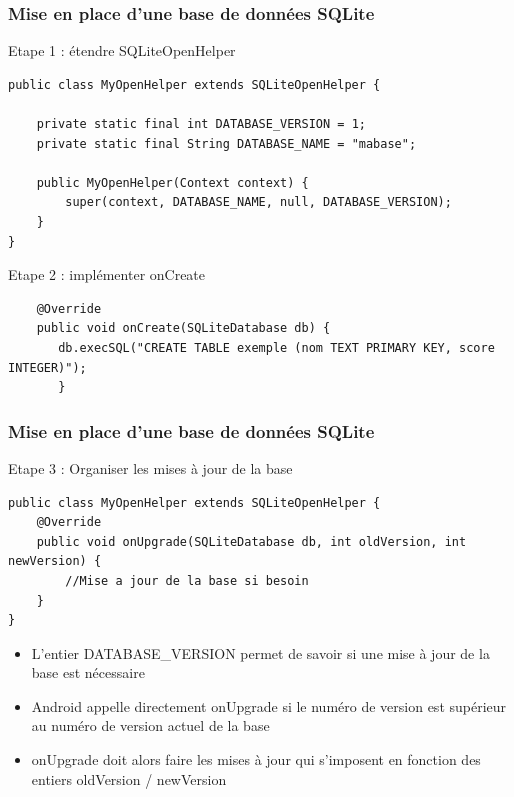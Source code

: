 \documentclass{beamer}
\begin{document}
\begin{frame}[fragile]
\frametitle{Mise en place d'une base de données SQLite}
Etape 1 : étendre SQLiteOpenHelper 
\begin{lstlisting}
public class MyOpenHelper extends SQLiteOpenHelper {

    private static final int DATABASE_VERSION = 1;
    private static final String DATABASE_NAME = "mabase";

    public MyOpenHelper(Context context) {
        super(context, DATABASE_NAME, null, DATABASE_VERSION);
    }
}
\end{lstlisting}
Etape 2 : implémenter onCreate
\begin{lstlisting}
    @Override
    public void onCreate(SQLiteDatabase db) {
       db.execSQL("CREATE TABLE exemple (nom TEXT PRIMARY KEY, score INTEGER)");
       }
\end{lstlisting}
\end{frame}
\begin{frame}[fragile]
\frametitle{Mise en place d'une base de données SQLite}
Etape 3 : Organiser les mises à jour de la base
\begin{lstlisting}
public class MyOpenHelper extends SQLiteOpenHelper {
    @Override
    public void onUpgrade(SQLiteDatabase db, int oldVersion, int newVersion) {
        //Mise a jour de la base si besoin
    }
}
\end{lstlisting}
\begin{itemize}
    \item L'entier DATABASE\_VERSION permet de savoir si une mise à jour de la base est nécessaire
    \item Android appelle directement onUpgrade si le numéro de version est supérieur au numéro de version actuel de la base
    \item onUpgrade doit alors faire les mises à jour qui s'imposent en fonction
    des entiers oldVersion / newVersion
\end{itemize}
\end{frame}
\end{document}
